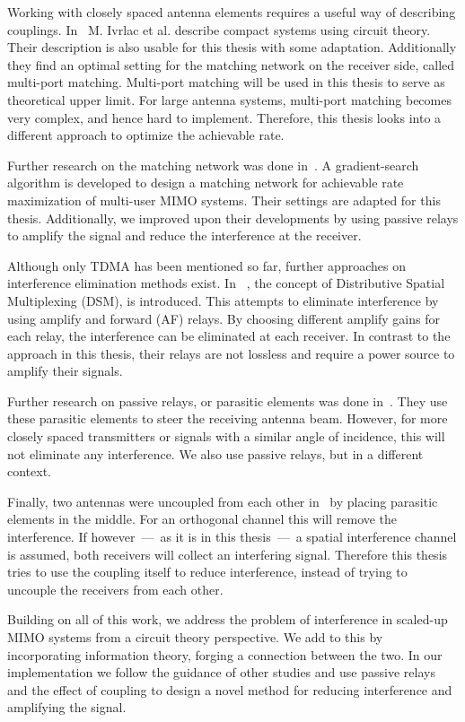 Working with closely spaced antenna elements requires a useful way of describing couplings.
In~\cite{Nossek} M. Ivrlac et al. describe compact systems using circuit theory.
Their description is also usable for this thesis with some adaptation.
Additionally they find an optimal setting for the matching network on the receiver side, called multi-port matching.
Multi-port matching will be used in this thesis to serve as theoretical upper limit.
For large antenna systems, multi-port matching becomes very complex, and hence hard to implement.
Therefore, this thesis looks into a different approach to optimize the achievable rate. 

Further research on the matching network was done in~\cite{Yahia2013}.
A gradient-search algorithm is developed to design a matching network for achievable rate maximization of multi-user MIMO systems.
Their settings are adapted for this thesis.
Additionally, we improved upon their developments by using passive relays to amplify the signal and reduce the interference at the receiver.

Although only TDMA has been mentioned so far, further approaches on interference elimination methods exist.
In ~\cite{Berger05}, the concept of Distributive Spatial Multiplexing (DSM), is introduced.
This attempts to eliminate interference by using amplify and forward (AF) relays.
By choosing different amplify gains for each relay, the interference can be eliminated at each receiver.
In contrast to the approach in this thesis, their relays are not lossless and require a power source to amplify their signals.

Further research on passive relays, or parasitic elements was done in~\cite{Bains08}.
They use these parasitic elements to steer the receiving antenna beam.
However, for more closely spaced transmitters or signals with a similar angle of incidence, this will not eliminate any interference.
We also use passive relays, but in a different context.

Finally, two antennas were uncoupled from each other in~\cite{Lau12} by placing parasitic elements in the middle.
For an orthogonal channel this will remove the interference.
If however~---~as it is in this thesis~---~a spatial interference channel is assumed, both receivers will collect an interfering signal.
Therefore this thesis tries to use the coupling itself to reduce interference, instead of trying to uncouple the receivers from each other.

Building on all of this work, we address the problem of interference in scaled-up MIMO systems from a circuit theory perspective.
We add to this by incorporating information theory, forging a connection between the two.
In our implementation we follow the guidance of other studies and use passive relays and the effect of coupling to design a novel method for reducing interference and amplifying the signal.

